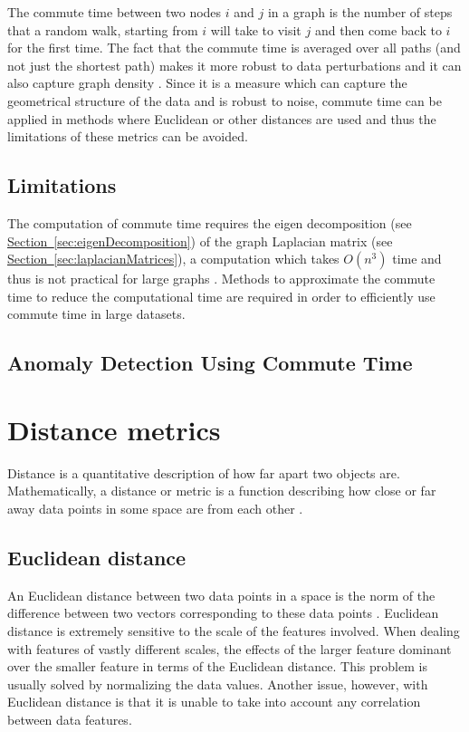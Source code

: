 The commute time between two nodes $i$ and $j$ in a graph is the number of steps
that a random walk, starting from $i$ will take to visit $j$ and then come back 
to $i$ for the first time. The fact that the commute time is averaged over all 
paths (and not just the shortest path) makes it more robust to data 
perturbations and it can also capture graph density \cite{Khoa:2012}. Since it 
is a measure which can capture the geometrical structure of the data and is 
robust to noise, commute time can be applied in methods where Euclidean or other
distances are used and thus the limitations of these metrics can be avoided.

\subsection{Limitations}
\label{sec:commuteTime:limitations}
The computation of commute time requires the eigen decomposition (see 
\hyperref[sec:eigenDecomposition] {Section~\ref{sec:eigenDecomposition}}) of the
graph Laplacian matrix (see \hyperref[sec:laplacianMatrices] 
{Section~\ref{sec:laplacianMatrices}}), a computation which takes $O(n^{3})$ 
time and thus is not practical for large graphs \citeneeded{}. Methods to 
approximate the commute time to reduce the computational time are required in 
order to efficiently use commute time in large datasets.

\subsection{Anomaly Detection Using Commute Time}
\label{sec:anomalyDetectionUsingCommuteTime}

\section{Distance metrics}
\label{sec:distanceMetrics}
Distance is a quantitative description of how far apart two objects are. 
Mathematically, a distance or metric is a function describing how close or far 
away data points in some space are from each other \cite{Khoa:2012}.

\subsection{Euclidean distance}
\label{sec:euclideanDistance}
An Euclidean distance between two data points in a space is the norm of the 
difference between two vectors corresponding to these data points 
\cite{Khoa:2012}. Euclidean distance is extremely sensitive to the scale of the 
features involved. When dealing with features of vastly different scales, the 
effects of the larger feature dominant over the smaller feature in terms of the 
Euclidean distance. This problem is usually solved by normalizing the data 
values. Another issue, however, with Euclidean distance is that it is unable to 
take into account any correlation between data features.

